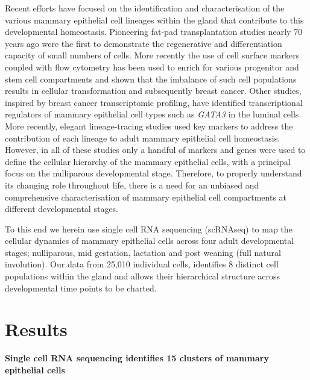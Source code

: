 \documentclass[titlepage, 12pt, oneside]{amsart}
\begin{document}
Recent efforts have focused on the identification and characterisation of the various mammary epithelial cell lineages within the gland that contribute to this developmental homeostasis.
Pioneering fat-pad transplantation studies nearly 70 years ago were the first to demonstrate the regenerative and differentiation capacity of small numbers of cells\autocite{Faulkin1960,Daniel197,Smalley1998}.
More recently the use of cell surface markers coupled with flow cytometry has been used to enrich for various progenitor and stem cell compartments\autocite{Smalley1998,Stingl2006,Shackleton2006,Asselin2007} and shown that the imbalance of such cell populations results in cellular transformation and subsequently breast cancer\autocite{Lim2009,Molyneux2010}.
Other studies, inspired by breast cancer transcriptomic profiling, have identified transcriptional regulators of mammary epithelial cell types such as \textit{GATA3} in the luminal cells\autocite{Asselin2007,Kouros2006}.
More recently, elegant lineage-tracing studies used key markers to address the contribution of each lineage to adult mammary epithelial cell homeostasis\autocite{Inman2015}.
However, in all of these studies only a handful of markers and genes were used to define the cellular hierarchy of the mammary epithelial cells, with a principal focus on the nulliparous developmental stage.
Therefore, to properly understand its changing role throughout life, there is a need for an unbiased and comprehensive characterisation of mammary epithelial cell compartments at different developmental stages.

To this end we herein use single cell RNA sequencing (scRNAseq) to map the cellular dynamics of mammary epithelial cells across four adult developmental stages; nulliparous, mid gestation, lactation and post weaning (full natural involution).
Our data from 25,010 individual cells, identifies 8 distinct cell populations within the gland and allows their hierarchical structure across developmental time points to be charted.

\section{Results}

\textbf{Single cell RNA sequencing identifies 15 clusters of mammary epithelial cells}
\end{document}
